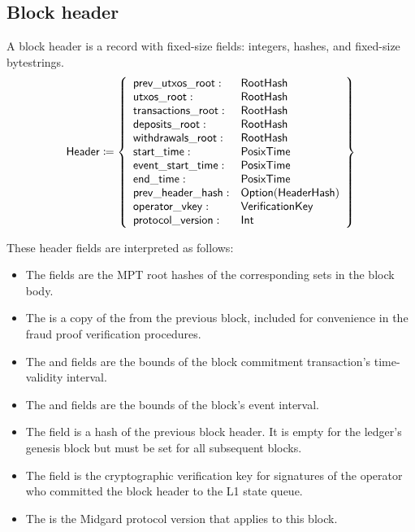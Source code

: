 \documentclass[../midgard.tex]{subfiles}
\begin{document}
\subsection{Block header}
\label{h:block-header}

A block header is a record with fixed-size fields: integers, hashes, and fixed-size bytestrings.
\begin{equation*}
    \mathsf{Header} \coloneq \left\{
    \begin{array}{ll}
        \mathsf{prev\_utxos\_root} : & \mathsf{RootHash} \\
        \mathsf{utxos\_root} : & \mathsf{RootHash} \\
        \mathsf{transactions\_root} : & \mathsf{RootHash} \\
        \mathsf{deposits\_root} : & \mathsf{RootHash} \\
        \mathsf{withdrawals\_root} : & \mathsf{RootHash} \\
        \mathsf{start\_time} : & \mathsf{PosixTime} \\
        \mathsf{event\_start\_time} : & \mathsf{PosixTime} \\
        \mathsf{end\_time} : & \mathsf{PosixTime} \\
        \mathsf{prev\_header\_hash} : & \mathsf{Option(HeaderHash)} \\
        \mathsf{operator\_vkey} : & \mathsf{VerificationKey} \\
        \mathsf{protocol\_version} : & \mathsf{Int} \\
    \end{array} \right\}
\end{equation*}

These header fields are interpreted as follows:
\begin{itemize}
    \item The  fields are the MPT root hashes of the corresponding sets in the block body.
    \item The  is a copy of the  from the previous block, included for convenience in the fraud proof verification procedures.
    \item The  and  fields are the bounds of the block commitment transaction's time-validity interval.
    \item The  and  fields are the bounds of the block's event interval.
    \item The  field is a hash of the previous block header.
      It is empty for the ledger's genesis block but must be set for all subsequent blocks.
    \item The  field is the cryptographic verification key for signatures of the operator who committed the block header to the L1 state queue.
    \item The  is the Midgard protocol version that applies to this block.
\end{itemize}
\end{document}
